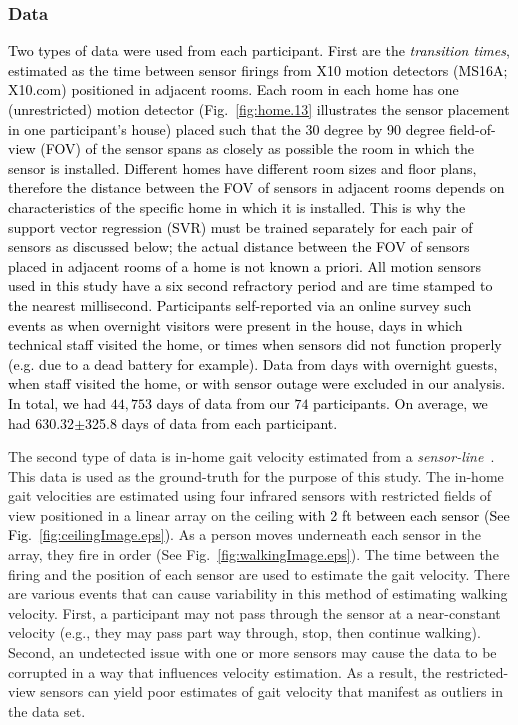 \documentclass[journal]{IEEEtran}
\newcommand{\RR}[1]{\textcolor{black}{#1}}
\newcommand{\ca}[1]{\textcolor{black}{#1}}
\newcommand{\DA}[1]{\textcolor{black}{#1}}
\begin{document}
\subsubsection{Data}
\DA{\RR{Two} types of data were used from each participant.  First are the \emph{transition times}, estimated as the time between sensor firings from X10 motion detectors (MS16A; X10.com) positioned in adjacent rooms. Each room in each home has one (unrestricted) motion detector (Fig.~\ref{fig:home.13} illustrates the sensor placement in one participant's house) placed such that the 30 degree by 90 degree field-of-view (FOV) of the sensor spans as closely as possible the room in which the sensor is installed.  Different homes have different room sizes and floor plans, therefore the distance between the FOV of sensors in adjacent rooms depends on characteristics of the specific home in which it is installed.  This is why the support vector regression (SVR) must be trained separately for each pair of sensors as discussed below; the actual distance between the FOV of sensors placed in adjacent rooms of a home is not known a priori. All motion sensors used in this study have a six second refractory period and are time stamped to the nearest millisecond.  
Participants self-reported via an online survey such events as when overnight visitors were present in the house, days in which technical staff visited the home, or times when sensors did not function properly (e.g. due to a dead battery for  example). Data from days with overnight guests, when staff visited the home, or with sensor outage were excluded in our analysis. \RR{In total, we had $44,753$ days of data from our $74$ participants. \ca{On average, we had 630.32$\pm$325.8 days of data from each participant.}}} 


The second type of data is in-home gait velocity estimated from a \emph{sensor-line}~\cite{hagler2010unobtrusive}.  This data is used as the ground-truth for the purpose of this study. The in-home gait velocities are estimated using four infrared sensors with restricted fields of view positioned in a linear array on the ceiling \DA{with 2 ft between each sensor (See Fig.~\ref{fig:ceilingImage.eps})}.  As a person moves underneath each sensor in the array, they fire in order (See Fig.~\ref{fig:walkingImage.eps}).  The time between the firing and the position of each sensor are used to estimate the gait velocity. There are various events that can cause variability in this method of estimating walking velocity.  First, a participant may not pass through the sensor at a near-constant velocity (e.g., they may pass part way through, stop, then continue walking). Second, an undetected issue with one or more sensors may cause the data to be corrupted in a way that influences velocity estimation.  As a result, the restricted-view sensors can yield poor estimates of gait velocity that manifest as outliers in the data set.  
\end{document}
